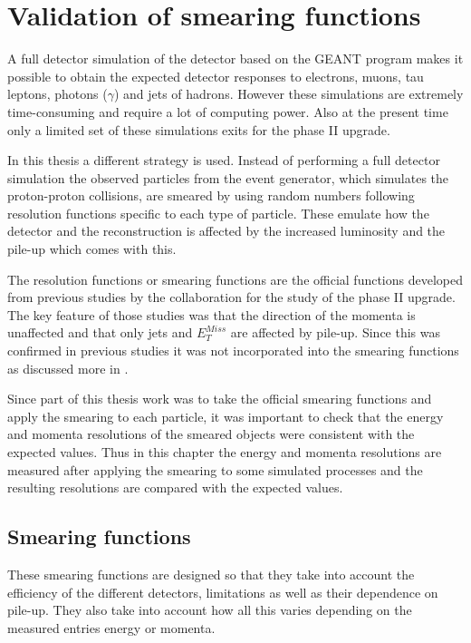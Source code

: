 \chapter{Validation of smearing functions}\label{cha:vali}
A full detector simulation of the \abbrATLAS detector based on the GEANT \citep{Geant4} program makes it possible to obtain the expected detector responses to electrons, muons, tau leptons, photons ($\gamma$) and jets of hadrons. However these simulations are extremely time-consuming and require a lot of computing power. Also at the present time only a limited set of these simulations exits for the \abbrATLAS phase II upgrade.

In this thesis a different strategy is used. Instead of performing a full detector simulation the observed particles from the event generator, which simulates the proton-proton collisions, are smeared by using random numbers following resolution functions specific to each type of particle. These emulate how the detector and the reconstruction is affected by the increased luminosity and the pile-up which comes with this. 

The resolution functions or smearing functions are the official functions developed from previous studies \citep{ATLAS:LOI2, ATL-PHYS-PUB-2013-004} by the \abbrATLAS collaboration for the study of the \abbrATLAS phase II upgrade. The key feature of those studies was that the direction of the momenta is unaffected and that only jets and $E^{Miss}_T$ are affected by pile-up. Since this was confirmed in previous studies it was not incorporated into the smearing functions as discussed more in .

Since part of this thesis work was to take the official \abbrATLAS smearing functions and apply the smearing to each particle, it was important to check that the energy and momenta resolutions of the smeared objects were consistent with the expected values. Thus in this chapter the energy and momenta resolutions are measured after applying the smearing to some simulated processes and the resulting resolutions are compared with the expected values.

\newpage
\section{Smearing functions}\label{sec:smear}
These smearing functions are designed so that they take into account the efficiency of the different detectors, limitations as well as their dependence on pile-up. They also take into account how all this varies depending on the measured entries energy or momenta.

